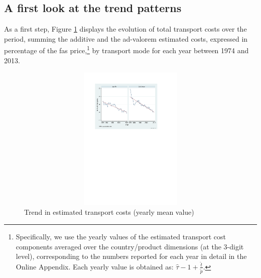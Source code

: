 \documentclass[a4paper,11pt]{article}
\begin{document}
\subsection{A first look at the trend patterns}

As a first step, Figure \ref{fig:Trends_in_TC} displays the evolution of total transport costs over the period, summing the additive and the ad-valorem estimated costs, expressed in percentage of the fas price,\footnote{Specifically, we use the yearly values of the estimated transport cost components averaged over the country/product dimensions (at the 3-digit level), corresponding to the numbers reported for each year in detail in the Online Appendix.
Each yearly value is obtained as: $\widehat{\tau}-1+\frac{\widehat{t}}{\widetilde{p}}$.} by transport mode for each year between 1974 and 2013.

\begin{figure}[htbp]
\caption{Trend in estimated transport costs (yearly mean value)}
\label{fig:Trends_in_TC}
\begin{center}
\includegraphics[width=14cm, height=7cm]{Figure2_Trend_of_totalTC_bymode.pdf}
\end{center}
\end{figure}
\end{document}
